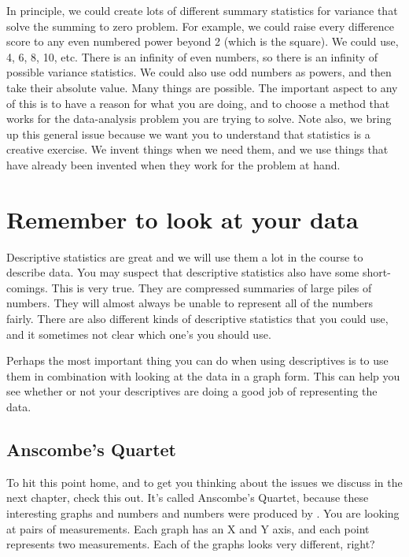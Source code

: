 \documentclass[
]{book}
\begin{document}
In principle, we could create lots of different summary statistics for variance that solve the summing to zero problem. For example, we could raise every difference score to any even numbered power beyond 2 (which is the square). We could use, 4, 6, 8, 10, etc. There is an infinity of even numbers, so there is an infinity of possible variance statistics. We could also use odd numbers as powers, and then take their absolute value. Many things are possible. The important aspect to any of this is to have a reason for what you are doing, and to choose a method that works for the data-analysis problem you are trying to solve. Note also, we bring up this general issue because we want you to understand that statistics is a creative exercise. We invent things when we need them, and we use things that have already been invented when they work for the problem at hand.

\hypertarget{remember-to-look-at-your-data}{%
\section{Remember to look at your data}\label{remember-to-look-at-your-data}}

Descriptive statistics are great and we will use them a lot in the course to describe data. You may suspect that descriptive statistics also have some short-comings. This is very true. They are compressed summaries of large piles of numbers. They will almost always be unable to represent all of the numbers fairly. There are also different kinds of descriptive statistics that you could use, and it sometimes not clear which one's you should use.

Perhaps the most important thing you can do when using descriptives is to use them in combination with looking at the data in a graph form. This can help you see whether or not your descriptives are doing a good job of representing the data.

\hypertarget{anscombes-quartet}{%
\subsection{Anscombe's Quartet}\label{anscombes-quartet}}

To hit this point home, and to get you thinking about the issues we discuss in the next chapter, check this out. It's called Anscombe's Quartet, because these interesting graphs and numbers and numbers were produced by \citet{Anscombe1973}. You are looking at pairs of measurements. Each graph has an X and Y axis, and each point represents two measurements. Each of the graphs looks very different, right?
\end{document}
